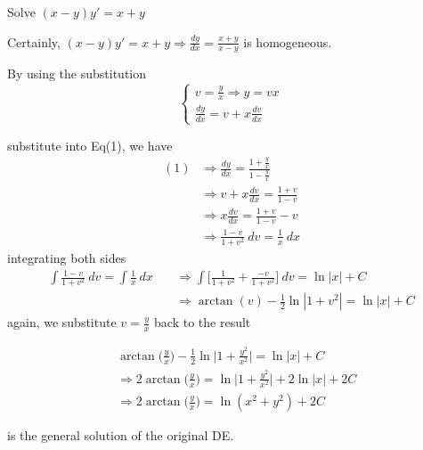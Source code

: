 \begin{example}
    Solve $(x - y)y' = x + y$
\end{example}
\begin{solution}
    Certainly, $(x - y)y' = x+y \Rightarrow \frac{dy}{dx} = \frac{x+y}{x-y}$ is homogeneous.

    By using the substitution
    \[
        \begin{cases}
            v = \frac{y}{x} \Rightarrow y = vx\\
            \frac{dy}{dx} = v + x \frac{dv}{dx}
        \end{cases}
    \]

    substitute into Eq(1), we have 
    \begin{align*}
        (1) &\Rightarrow \frac{dy}{dx} = \frac{1 + \frac{y}{x}}{1 - \frac{y}{x}}\\
        &\Rightarrow v + x\frac{dv}{dx} = \frac{1+v}{1-v}\\
        &\Rightarrow x \frac{dv}{dx} = \frac{1+v}{1-v} - v\\
        &\Rightarrow \frac{1-v}{1+v^2} \> dv = \frac{1}{x} \> dx
    \end{align*}
    integrating both sides
    \begin{align*}
        \int \frac{1-v}{1+v^2} \> dv = \int \frac{1}{x} \> dx \quad &\Rightarrow 
        \int \biggl[\frac{1}{1+v^2} + \frac{-v}{1+v^2}\biggr] \> dv = \ln |x| + C\\
        &\Rightarrow \arctan(v) - \frac{1}{2} \ln |1+v^2| = \ln|x| + C
    \end{align*}
    again, we substitute $v = \frac{y}{x}$ back to the result

    \begin{align*}
        & \arctan \biggl(\frac{y}{x}\biggr) - \frac{1}{2} \ln \bigg \vert 1+\frac{y^2}{x^2} \bigg \vert = \ln|x| + C\\
        &\Rightarrow 2 \arctan \biggl(\frac{y}{x}\biggr) = \ln \bigg \vert 1+\frac{y^2}{x^2} \bigg \vert + 2 \ln |x| + 2C\\
        &\Rightarrow 2 \arctan \biggl(\frac{y}{x}\biggr) = \ln (x^2 + y^2) + 2C
    \end{align*}

    is the general solution of the original DE.
\end{solution}

